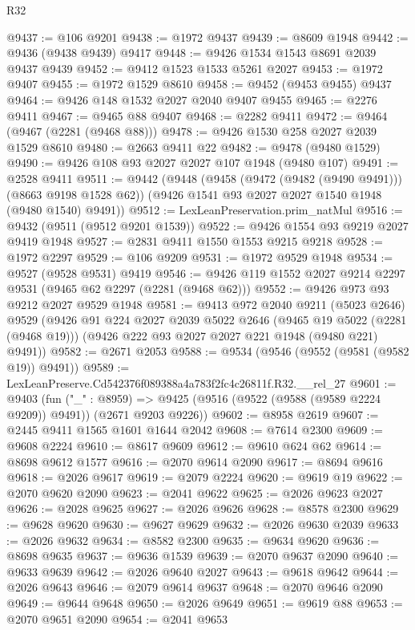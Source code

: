 \begin{lexlean}{R32}
\begin{coremodule}
@9437 := @106 @9201
@9438 := @1972 @9437
@9439 := @8609 @1948
@9442 := @9436 (@9438 @9439) @9417
@9448 := @9426 @1534 @1543 @8691 @2039 @9437 @9439
@9452 := @9412 @1523 @1533 @5261 @2027
@9453 := @1972 @9407
@9455 := @1972 @1529 @8610
@9458 := @9452 (@9453 @9455) @9437
@9464 := @9426 @148 @1532 @2027 @2040 @9407 @9455
@9465 := @2276 @9411
@9467 := @9465 @88 @9407
@9468 := @2282 @9411
@9472 := @9464 (@9467 (@2281 (@9468 @88)))
@9478 := @9426 @1530 @258 @2027 @2039 @1529 @8610
@9480 := @2663 @9411 @22
@9482 := @9478 (@9480 @1529)
@9490 := @9426 @108 @93 @2027 @2027 @107 @1948 (@9480 @107)
@9491 := @2528 @9411
@9511 := @9442
    (@9448
      (@9458 (@9472 (@9482 (@9490 @9491))) (@8663 @9198 @1528 @62))
      (@9426 @1541 @93 @2027 @2027 @1540 @1948 (@9480 @1540) @9491))
@9512 := LexLeanPreservation.prim_natMul
@9516 := @9432 (@9511 (@9512 @9201 @1539))
@9522 := @9426 @1554 @93 @9219 @2027 @9419 @1948
@9527 := @2831 @9411 @1550 @1553 @9215 @9218
@9528 := @1972 @2297
@9529 := @106 @9209
@9531 := @1972 @9529 @1948
@9534 := @9527 (@9528 @9531) @9419
@9546 := @9426 @119 @1552 @2027 @9214 @2297 @9531 (@9465 @62 @2297 (@2281 (@9468 @62)))
@9552 := @9426 @973 @93 @9212 @2027 @9529 @1948
@9581 := @9413
    @972
    @2040
    @9211
    (@5023 @2646)
    @9529
    (@9426
      @91
      @224
      @2027
      @2039
      @5022
      @2646
      (@9465 @19 @5022 (@2281 (@9468 @19)))
      (@9426 @222 @93 @2027 @2027 @221 @1948 (@9480 @221) @9491))
@9582 := @2671 @2053
@9588 := @9534 (@9546 (@9552 (@9581 (@9582 @19)) @9491))
@9589 := LexLeanPreserve.Cd542376f089388a4a783f2fc4c26811f.R32.__rel_27
@9601 := @9403
    (fun ("_" : @8959) =>
    @9425 (@9516 (@9522 (@9588 (@9589 @2224 @9209)) @9491)) (@2671 @9203 @9226))
@9602 := @8958 @2619
@9607 := @2445 @9411 @1565 @1601 @1644 @2042
@9608 := @7614 @2300
@9609 := @9608 @2224
@9610 := @8617 @9609
@9612 := @9610 @624 @62
@9614 := @8698 @9612 @1577
@9616 := @2070 @9614 @2090
@9617 := @8694 @9616
@9618 := @2026 @9617
@9619 := @2079 @2224
@9620 := @9619 @19
@9622 := @2070 @9620 @2090
@9623 := @2041 @9622
@9625 := @2026 @9623 @2027
@9626 := @2028 @9625
@9627 := @2026 @9626
@9628 := @8578 @2300
@9629 := @9628 @9620
@9630 := @9627 @9629
@9632 := @2026 @9630 @2039
@9633 := @2026 @9632
@9634 := @8582 @2300
@9635 := @9634 @9620
@9636 := @8698 @9635
@9637 := @9636 @1539
@9639 := @2070 @9637 @2090
@9640 := @9633 @9639
@9642 := @2026 @9640 @2027
@9643 := @9618 @9642
@9644 := @2026 @9643
@9646 := @2079 @9614 @9637
@9648 := @2070 @9646 @2090
@9649 := @9644 @9648
@9650 := @2026 @9649
@9651 := @9619 @88
@9653 := @2070 @9651 @2090
@9654 := @2041 @9653

\end{coremodule}
\end{lexlean}
